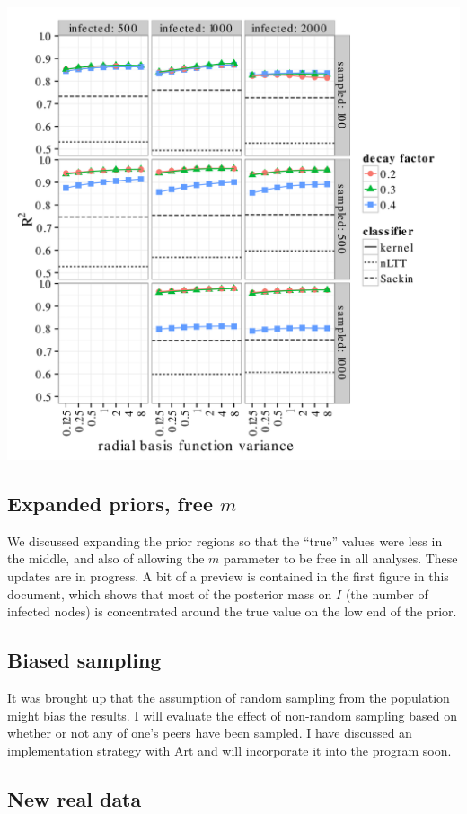\documentclass{article}
\begin{document}
\includegraphics[scale=0.15]{crossv}

\subsection*{Expanded priors, free $m$}

We discussed expanding the prior regions so that the ``true'' values were less
in the middle, and also of allowing the $m$ parameter to be free in all
analyses. These updates are in progress. A bit of a preview is contained in the
first figure in this document, which shows that most of the posterior mass on
$I$ (the number of infected nodes) is concentrated around the true value on the
low end of the prior.

\subsection*{Biased sampling}

It was brought up that the assumption of random sampling from the population
might bias the results. I will evaluate the effect of non-random sampling based
on whether or not any of one's peers have been sampled. I have discussed an
implementation strategy with Art and will incorporate it into the program soon.

\subsection*{New real data}
\end{document}
